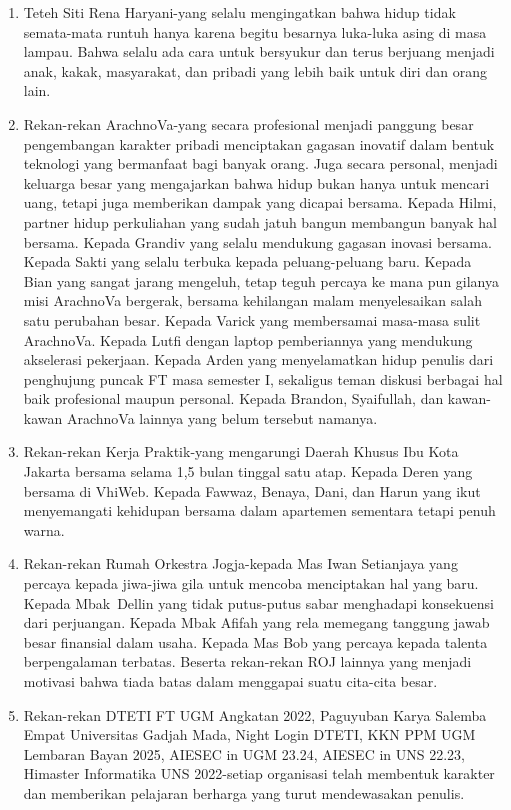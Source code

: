 \begin{enumerate}[leftmargin=*]
	\item Teteh Siti Rena Haryani-yang selalu mengingatkan bahwa hidup tidak semata-mata runtuh hanya karena begitu besarnya luka-luka asing di masa lampau. Bahwa selalu ada cara untuk bersyukur dan terus berjuang menjadi anak, kakak, masyarakat, dan pribadi yang lebih baik untuk diri dan orang lain.
	
	\item Rekan-rekan ArachnoVa-yang secara profesional menjadi panggung besar pengembangan karakter pribadi menciptakan gagasan inovatif dalam bentuk teknologi yang bermanfaat bagi banyak orang. Juga secara personal, menjadi keluarga besar yang mengajarkan bahwa hidup bukan hanya untuk mencari uang, tetapi juga memberikan dampak yang dicapai bersama. Kepada Hilmi, partner hidup perkuliahan yang sudah jatuh bangun membangun banyak hal bersama. Kepada Grandiv yang selalu mendukung gagasan inovasi bersama. Kepada Sakti yang selalu terbuka kepada peluang-peluang baru. Kepada Bian yang sangat jarang mengeluh, tetap teguh percaya ke mana pun gilanya misi ArachnoVa bergerak, bersama kehilangan malam menyelesaikan salah satu perubahan besar. Kepada Varick yang membersamai masa-masa sulit ArachnoVa. Kepada Lutfi dengan laptop pemberiannya yang mendukung akselerasi pekerjaan. Kepada Arden yang menyelamatkan hidup penulis dari penghujung puncak FT masa semester I, sekaligus teman diskusi berbagai hal baik profesional maupun personal. Kepada Brandon, Syaifullah, dan kawan-kawan ArachnoVa lainnya yang belum tersebut namanya.
	
	\item Rekan-rekan Kerja Praktik-yang mengarungi Daerah Khusus Ibu Kota Jakarta bersama selama 1,5 bulan tinggal satu atap. Kepada Deren yang bersama di VhiWeb. Kepada Fawwaz, Benaya, Dani, dan Harun yang ikut menyemangati kehidupan bersama dalam apartemen sementara tetapi penuh warna.
	
	\item Rekan-rekan Rumah Orkestra Jogja-kepada Mas Iwan Setianjaya yang percaya kepada jiwa-jiwa gila untuk mencoba menciptakan hal yang baru. Kepada \mbox{Mbak Dellin} yang tidak putus-putus sabar menghadapi konsekuensi dari perjuangan. Kepada Mbak Afifah yang rela memegang tanggung jawab besar finansial dalam usaha. Kepada Mas Bob yang percaya kepada talenta berpengalaman terbatas. Beserta rekan-rekan ROJ lainnya yang menjadi motivasi bahwa tiada batas dalam menggapai suatu cita-cita besar.
	
	\item Rekan-rekan DTETI FT UGM Angkatan 2022, Paguyuban Karya Salemba Empat Universitas Gadjah Mada, Night Login DTETI, KKN PPM UGM Lembaran Bayan 2025, AIESEC in UGM 23.24, AIESEC in UNS 22.23, Himaster Informatika UNS 2022-setiap organisasi telah membentuk karakter dan memberikan pelajaran berharga yang turut mendewasakan penulis.
	

\end{enumerate}
